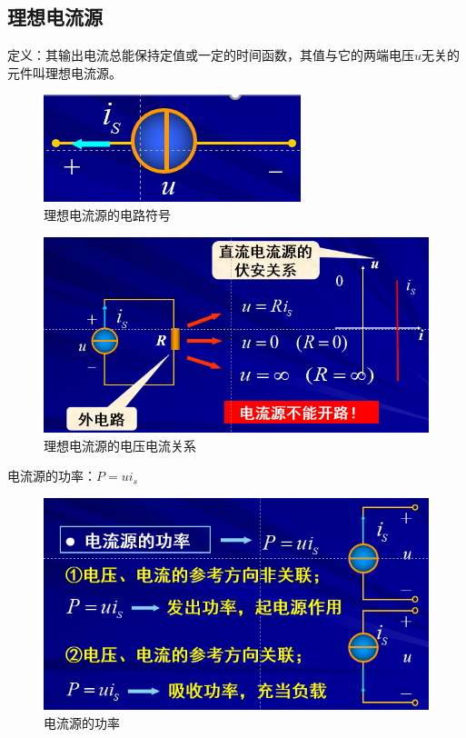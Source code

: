 \documentclass[11pt,a4paper,oneside]{book}
\begin{document}
\subsection{理想电流源}
定义：其输出电流总能保持定值或一定的时间函数，其值与它的两端电压$u$无关的元件叫理想电流源。
\begin{figure}[H]
	\centering
	\includegraphics[width=0.3\linewidth]{screenshot117}
	\caption{理想电流源的电路符号}
	\label{fig:screenshot117}
\end{figure}
\begin{figure}[H]
	\centering
	\includegraphics[width=0.6\linewidth]{screenshot118}
	\caption{理想电流源的电压电流关系}
	\label{fig:screenshot118}
\end{figure}
电流源的功率：$P=ui_s$
\begin{figure}[H]
	\centering
	\includegraphics[width=0.6\linewidth]{screenshot119}
	\caption{电流源的功率}
	\label{fig:screenshot119}
\end{figure}
\end{document}
